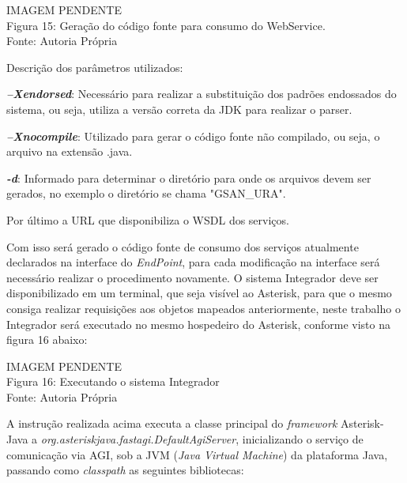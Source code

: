 \begin{center}
	IMAGEM PENDENTE \\
	Figura 15: Geração do código fonte para consumo do WebService. \\
	Fonte: Autoria Própria\\		
\end{center}

Descrição dos parâmetros utilizados:

\begin{description}
	\item \textbf{\textit{–Xendorsed}}: Necessário para realizar a substituição dos padrões endossados do sistema, ou seja, utiliza a versão correta da JDK para realizar o parser.
	\item \textbf{\textit{–Xnocompile}}: Utilizado para gerar o código fonte não compilado, ou seja, o arquivo na extensão .java.
	\item \textbf{\textit{-d}}: Informado para determinar o diretório para onde os arquivos devem ser gerados, no exemplo o diretório se chama "GSAN\_URA".
	\item Por último a URL que disponibiliza o WSDL dos serviços. 
\end{description}



Com isso será gerado o código fonte de consumo dos serviços atualmente declarados na interface do \textit{EndPoint}, para cada modificação na interface será necessário realizar o procedimento novamente. O sistema Integrador deve ser disponibilizado em um terminal, que seja visível ao Asterisk, para que o mesmo consiga realizar requisições aos objetos mapeados anteriormente, neste trabalho o Integrador será executado no mesmo hospedeiro do Asterisk, conforme visto na figura 16 abaixo:

\begin{center}
	IMAGEM PENDENTE \\
	Figura 16: Executando o sistema Integrador \\
	Fonte: Autoria Própria \\			
\end{center}

A instrução realizada acima executa a classe principal do \textit{framework} Asterisk-Java a \textit{ org.asteriskjava.fastagi.DefaultAgiServer}, inicializando o serviço de comunicação via AGI, sob a JVM (\textit{Java Virtual Machine}) da plataforma Java, passando como \textit{classpath} as seguintes bibliotecas: 

